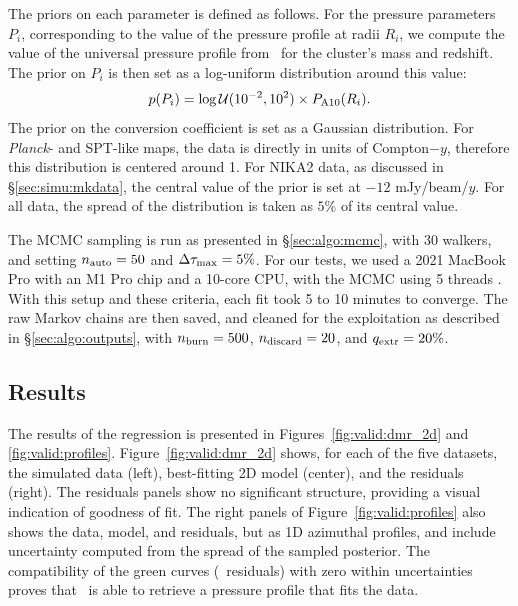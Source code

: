 The priors on each parameter is defined as follows.
For the pressure parameters $P_i$, corresponding to the value of the pressure profile at radii $R_i$, we compute the value of the universal pressure profile from \aten\ for the cluster's mass and redshift.
The prior on $P_i$ is then set as a log-uniform distribution around this value:
\begin{equation}
    \label{eq:simu:prior_Pi}
    p(P_i) = \log\mathcal{U}(10^{-2}, 10^2) \times P_{\rm A10}(R_i).
\end{equation}
The prior on the conversion coefficient is set as a Gaussian distribution.
For \textit{Planck}- and SPT-like maps, the data is directly in units of Compton$-y$, therefore this distribution is centered around 1.
For NIKA2 data, as discussed in \S\ref{sec:simu:mkdata}, the central value of the prior is set at $-12$ mJy/beam/$y$.
For all data, the spread of the distribution is taken as $5\%$ of its central value.

The MCMC sampling is run as presented in \S\ref{sec:algo:mcmc}, with $30$ walkers, and setting $n_{\rm auto} = 50$ and $\Delta\tau_{\rm max} = 5\%$.
For our tests, we used a 2021 MacBook Pro with an M1 Pro chip and a 10-core CPU, with the MCMC using 5 threads .
With this setup and these criteria, each fit took 5 to 10 minutes to converge.
The raw Markov chains are then saved, and cleaned for the exploitation as described in \S\ref{sec:algo:outputs}, with $n_{\rm burn} = 500$, $n_{\rm discard} = 20$, and $q_{\rm extr} = 20\%$.

\subsection{Results} \label{sec:simu:results}

The results of the regression is presented in Figures~\ref{fig:valid:dmr_2d} and \ref{fig:valid:profiles}.
Figure~\ref{fig:valid:dmr_2d} shows, for each of the five datasets, the simulated data (left), best-fitting 2D model (center), and the residuals (right).
The residuals panels show no significant structure, providing a visual indication of goodness of fit.
The right panels of Figure~\ref{fig:valid:profiles} also shows the data, model, and residuals, but as 1D azimuthal profiles, and include uncertainty computed from the spread of the sampled posterior.
The compatibility of the green curves (\ie\ residuals) with zero within uncertainties proves that \panco\ is able to retrieve a pressure profile that fits the data.

